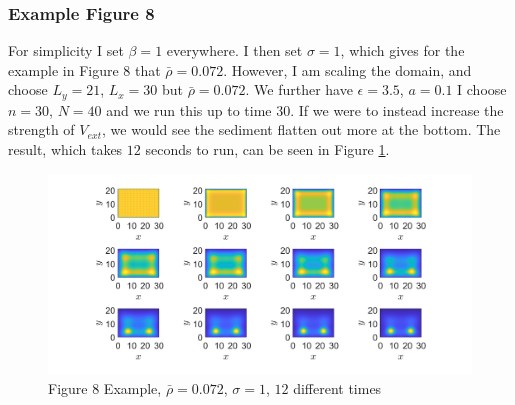 \documentclass[11pt, a4paper]{article}
\theoremstyle{definition}
\begin{document}
	\subsubsection{Example Figure 8}
	For simplicity I set $\beta = 1$ everywhere. I then set $\sigma = 1$, which gives for the example in Figure 8 that $\bar \rho = 0.072$. However, I am scaling the domain, and choose $L_y = 21$, $L_x = 30$ but $\bar \rho = 0.072$. We further have $\epsilon = 3.5$, $a = 0.1$
	I choose $n = 30$, $N = 40$ and we run this up to time $30$. If we were to instead increase the strength of $V_{ext}$, we would see the sediment flatten out more at the bottom. The result, which takes $12$ seconds to run, can be seen in Figure \ref{F1}. 
	\begin{figure}[h]
		\centering
		\includegraphics[scale=0.35]{Ex8F1.png}
		\caption{Figure 8 Example, $\bar \rho = 0.072$, $\sigma = 1$, $12$ different times} 
		\label{F1}
	\end{figure} 
 
	
	
\end{document}
